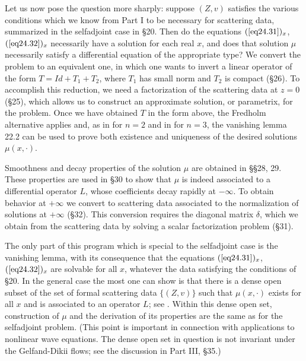 \documentclass{surv-l}
\theoremstyle{plain}
\theoremstyle{definition}
\numberwithin{equation}{chapter}
\begin{document}
Let us now pose the question more sharply: suppose $(Z, v)$ satisfies the various conditions which we know from Part I to be necessary for scattering data, summarized in the selfadjoint case in \S 20. Then do the equations $(\text{\ref{eq24.31}})_{x}$, $(\text{\ref{eq24.32}})_{x}$ necessarily have a solution for each real $x$, and does that solution $\mu$ necessarily satisfy a differential equation of the appropriate type? We convert the problem to an equivalent one, in which one wants to invert a linear operator of the form $T = Id + T_{1}+T_{2}$, where $T_{1}$ has small norm and $T_{2}$ is compact (\S 26). To accomplish this reduction, we need a factorization of the scattering data at $z=0$ (\S 25), which allows us to construct an approximate solution, or parametrix, for the problem. Once we have obtained $T$ in the form above, the Fredholm alternative applies and, as in \cite{DT} for $n=2$ and in \cite{DTT} for $n=3$, the vanishing lemma 22.2 can be used to prove both existence and uniqueness of the desired solutions $\mu(x,\cdot)$.

Smoothness and decay properties of the solution $\mu$ are obtained in \S\S 28, 29. These properties are used in \S 30 to show that $\mu$ is indeed associated to a differential operator $L$, whose coefficients decay rapidly at $-\infty$. To obtain behavior at $+\infty$ we convert to scattering data associated to the normalization of solutions at $+\infty$ (\S 32). This conversion requires the diagonal matrix $\delta$, which we obtain from the scattering data by solving a scalar factorization problem (\S 31).

The only part of this program which is special to the selfadjoint case is the vanishing lemma, with its consequence that the equations $(\text{\ref{eq24.31}})_{x}$, $(\text{\ref{eq24.32}})_{x}$ are solvable for all $x$, whatever the data satisfying the conditions of \S 20. In the general case the most one can show is that there is a dense open subset of the set of formal scattering data $\{(Z, v)\}$ such that $\mu(x, \cdot)$ exists for all $x$ and is associated to an operator $L$; see \cite{Be}. Within this dense open set, construction of $\mu$ and the derivation of its properties are the same as for the selfadjoint problem. (This point is important in connection with applications to nonlinear wave equations. The dense open set in question is not invariant under the Gelfand-Dikii flows; see the discussion in Part III, \S 35.)
\setcounter{section}{20}
\end{document}
